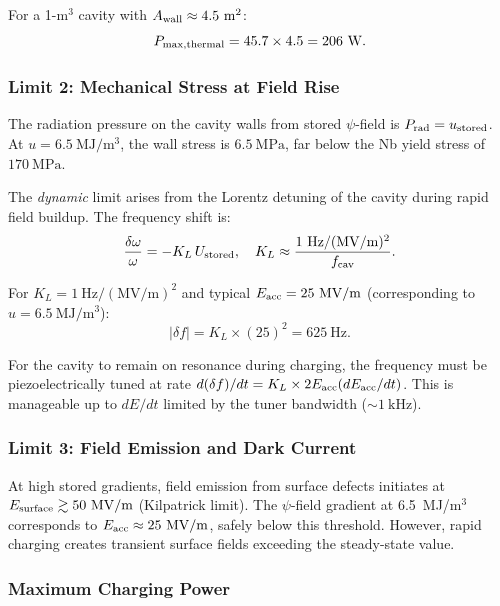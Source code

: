 \documentclass[aps,prd,twocolumn,superscriptaddress]{revtex4-2}
\begin{document}
For a 1-m$^3$ cavity with $A_{\rm wall} \approx 4.5~\mathrm{m^2}$:
\begin{equation}
P_{\rm max,thermal} = 45.7\times 4.5 = 206~\mathrm{W}.
\end{equation}

\subsubsection{Limit 2: Mechanical Stress at Field Rise}

The radiation pressure on the cavity walls from stored $\psi$-field
is $P_{\rm rad} = u_{\rm stored}$.  At $u = 6.5~\mathrm{MJ/m^3}$,
the wall stress is $6.5~\mathrm{MPa}$, far below the Nb yield stress
of $170~\mathrm{MPa}$.

The \emph{dynamic} limit arises from the Lorentz detuning of
the cavity during rapid field buildup.  The frequency shift is:
\begin{equation}
\frac{\delta\omega}{\omega} = -K_L\,U_{\rm stored},
\quad K_L \approx \frac{1~\mathrm{Hz/(MV/m)^2}}{f_{\rm cav}}.
\end{equation}

For $K_L = 1~\mathrm{Hz/(MV/m)^2}$ and typical $E_{\rm acc} = 25~\mathrm{MV/m}$
(corresponding to $u = 6.5~\mathrm{MJ/m^3}$):
\begin{equation}
|\delta f| = K_L\times(25)^2 = 625~\mathrm{Hz}.
\end{equation}

For the cavity to remain on resonance during charging, the frequency
must be piezoelectrically tuned at rate $d(\delta f)/dt = K_L \times
2E_{\rm acc}(dE_{\rm acc}/dt)$.  This is manageable up to $dE/dt$
limited by the tuner bandwidth ($\sim 1~\mathrm{kHz}$).

\subsubsection{Limit 3: Field Emission and Dark Current}

At high stored gradients, field emission from surface defects
initiates at $E_{\rm surface} \gtrsim 50~\mathrm{MV/m}$ (Kilpatrick limit).
The $\psi$-field gradient at 6.5~MJ/m$^3$ corresponds to
$E_{\rm acc} \approx 25~\mathrm{MV/m}$, safely below this threshold.
However, rapid charging creates transient surface fields exceeding
the steady-state value.

\subsubsection{Maximum Charging Power}
\end{document}
